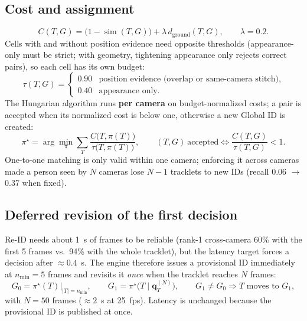 \documentclass[11pt,a4paper]{article}
\newcommand{\simf}{\operatorname{sim}}
\begin{document}
\subsection{Cost and assignment}
\begin{equation}
  C(T,G) = \bigl(1 - \simf(T,G)\bigr) + \lambda\, d_{\text{ground}}(T,G), \qquad \lambda = 0.2 .
\end{equation}
Cells with and without position evidence need opposite thresholds (appearance-only must be
strict; with geometry, tightening appearance only rejects correct pairs), so each cell has
its own budget:
\begin{equation}
  \tau(T,G) =
  \begin{cases}
    0.90 & \text{position evidence (overlap or same-camera stitch)},\\
    0.40 & \text{appearance only}.
  \end{cases}
\end{equation}
The Hungarian algorithm runs \textbf{per camera} on budget-normalized costs; a pair is
accepted when its normalized cost is below one, otherwise a new Global ID is created:
\begin{equation}
  \pi^\star = \arg\min_{\pi} \sum_{T} \frac{C\bigl(T,\pi(T)\bigr)}{\tau\bigl(T,\pi(T)\bigr)},
  \qquad (T,G)\ \text{accepted} \iff \frac{C(T,G)}{\tau(T,G)} < 1 .
\end{equation}
One-to-one matching is only valid within one camera; enforcing it across cameras made a person
seen by $N$ cameras lose $N-1$ tracklets to new IDs (recall 0.06 $\to$ 0.37 when fixed).

\subsection{Deferred revision of the first decision}
Re-ID needs about 1~s of frames to be reliable (rank-1 cross-camera 60\% with the first 5
frames vs.\ 94\% with the whole tracklet), but the latency target forces a decision after
$\approx 0.4$~s. The engine therefore issues a provisional ID immediately at $n_{\min}=5$
frames and revisits it \emph{once} when the tracklet reaches $N$ frames:
\begin{equation}
  G_0 = \pi^\star(T)\big|_{|T| = n_{\min}}, \qquad
  G_1 = \pi^\star\bigl(T \mid \mathbf q_T^{(N)}\bigr), \qquad
  G_1 \neq G_0 \Rightarrow T \text{ moves to } G_1 ,
\end{equation}
with $N = 50$ frames ($\approx 2$~s at 25~fps). Latency is unchanged because the provisional ID
is published at once.
\end{document}
